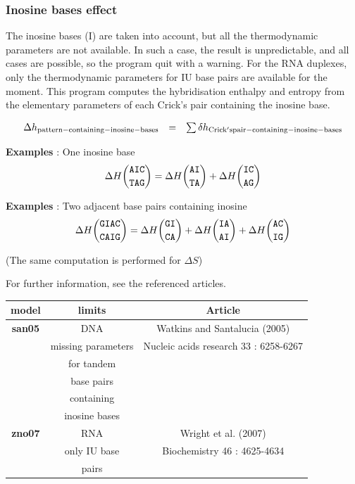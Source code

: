 \documentclass{article}
\begin{document}
\subsubsection{Inosine bases effect}

The inosine bases (I) are taken into account, but all the thermodynamic parameters are not available. 
In such a case, the result is unpredictable, and all cases are possible, so the
program quit with a warning. For the RNA duplexes, only the thermodynamic parameters
for IU base pairs are available for the moment.
This program computes the hybridisation enthalpy and entropy from the elementary 
parameters of each Crick's pair containing the inosine base.

\begin{displaymath}
  \begin{array}[t]{ccc}
  \Delta{}h_\mathrm{pattern-containing-inosine-bases}&=&\sum
  \delta{}h_\mathrm{Crick's pair-containing-inosine-bases}\\
  \end{array}
\end{displaymath}

\textbf{Examples} : One inosine base
\begin{multline*}
\Delta H {\mbox{\texttt{AIC}} \choose \mbox{\texttt{TAG}}} = 
\Delta H {\mbox{\texttt{AI}} \choose \mbox{\texttt{TA}}} +
\Delta H {\mbox{\texttt{IC}} \choose \mbox{\texttt{AG}}}\\
\end{multline*}

\textbf{Examples} : Two adjacent base pairs containing inosine
\begin{multline*}
\Delta H {\mbox{\texttt{GIAC}} \choose \mbox{\texttt{CAIG}}} = 
\Delta H {\mbox{\texttt{GI}} \choose \mbox{\texttt{CA}}} +
\Delta H {\mbox{\texttt{IA}} \choose \mbox{\texttt{AI}}} +
\Delta H {\mbox{\texttt{AC}} \choose \mbox{\texttt{IG}}}\\
\end{multline*}

       (The same computation is performed for $\Delta S$) 
       
For further information, see the referenced articles.

\begin{table}[hc]
\begin{tabular}[h]{| c | c | c |}
\textbf{model} & \textbf{limits} & \textbf{Article} \\
\hline
\textbf{san05} & DNA & Watkins and Santalucia (2005)\\
 & missing parameters & Nucleic acids research 33 : 6258-6267 \\
 & for tandem & \\
 & base pairs & \\
 & containing & \\
 & inosine bases & \\
 \hline
\textbf{zno07} & RNA & Wright et al. (2007)\\
 & only IU base & Biochemistry 46 : 4625-4634 \\
 & pairs & \\
 \hline
\end{tabular}
\end{table}
\end{document}
